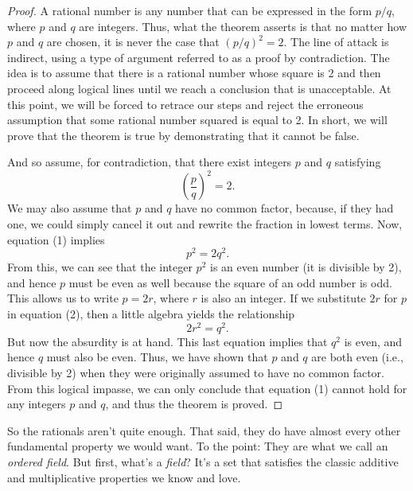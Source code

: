 \documentclass[11pt,twoside=off,numbers=noenddot]{scrbook}
\begin{document}
\begin{proof}
  A rational number is any number that can be expressed in the form
  $p/q$, where $p$ and $q$ are integers. Thus, what the theorem
  asserts is that no matter how $p$ and $q$ are chosen, it is never
  the case that $(p/q)^2 = 2$. The line of attack is indirect, using
  a type of argument referred to as a proof by contradiction. The
  idea is to assume that there is a rational number whose square is 2
  and then proceed along logical lines until we reach a conclusion
  that is unacceptable. At this point, we will be forced to retrace
  our steps and reject the erroneous assumption that some rational
  number squared is equal to 2. In short, we will prove that the
  theorem is true by demonstrating that it cannot be false.

  And so assume, for contradiction, that there exist integers $p$ and
  $q$ satisfying
  \[ \left(\frac{p}{q}\right)^2 = 2. \tag{1} \]
  We may also assume that $p$ and $q$ have no common factor, because,
  if they had one, we could simply cancel it out and rewrite the
  fraction in lowest terms. Now, equation (1) implies
  \[ p^2 = 2q^2. \tag{2} \]
  From this, we can see that the integer $p^2$ is an even number (it
  is divisible by 2), and hence $p$ must be even as well because the
  square of an odd number is odd. This allows us to write $p = 2r$,
  where $r$ is also an integer. If we substitute $2r$ for $p$ in
  equation (2), then a little algebra yields the relationship
  \[ 2r^2 = q^2. \]
  But now the absurdity is at hand. This last equation implies that
  $q^2$ is even, and hence $q$ must also be even. Thus, we have shown
  that $p$ and $q$ are both even (i.e., divisible by 2) when they
  were originally assumed to have no common factor. From this logical
  impasse, we can only conclude that equation (1) cannot hold for any
  integers $p$ and $q$, and thus the theorem is proved.
\end{proof}

\begin{remark}
  So the rationals aren't quite enough. That said, they do have
  almost every other fundamental property we would want. To the
  point: They are what we call an \textit{ordered field}. But first,
  what's a \textit{field}? It's a set that satisfies the classic
  additive and multiplicative properties we know and love.
\end{remark}
\end{document}
